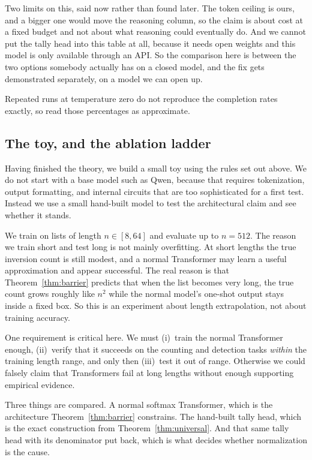 \documentclass[10pt]{article}
\theoremstyle{definition}
\begin{document}
Two limits on this, said now rather than found later. The token ceiling is ours, and a bigger one would move the reasoning column, so the claim is
about cost at a fixed budget and not about what reasoning could eventually
do. And we cannot put the tally head into this table at all, because it
needs open weights and this model is only available through an API. So the
comparison here is between the two options somebody actually has on a
closed model, and the fix gets demonstrated separately, on a model we can open up.

Repeated runs at temperature zero do not reproduce the completion rates
exactly, so read those percentages as approximate.

\subsection{The toy, and the ablation ladder}

Having finished the theory, we build a small toy using the rules set out
above. We do not start with a base model such as Qwen, because that
requires tokenization, output formatting, and internal circuits that are
too sophisticated for a first test. Instead we use a small hand-built
model to test the architectural claim and see whether it stands.

We train on lists of length $n \in [8, 64]$ and evaluate up to $n = 512$.
The reason we train short and test long is not mainly overfitting. At
short lengths the true inversion count is still modest, and a normal
Transformer may learn a useful approximation and appear successful. The
real reason is that Theorem~\ref{thm:barrier} predicts that when the list
becomes very long, the true count grows roughly like $n^2$ while the
normal model's one-shot output stays inside a fixed box. So this is an
experiment about length extrapolation, not about training accuracy.

One requirement is critical here. We must (i)~train the normal Transformer
enough, (ii)~verify that it succeeds on the counting and detection tasks
\emph{within} the training length range, and only then (iii)~test it out
of range. Otherwise we could falsely claim that Transformers fail at long
lengths without enough supporting empirical evidence.

Three things are compared. A normal softmax Transformer, which is the
architecture Theorem~\ref{thm:barrier} constrains. The hand-built tally
head, which is the exact construction from Theorem~\ref{thm:universal}.
And that same tally head with its denominator put back, which is what
decides whether normalization is the cause.
\end{document}
